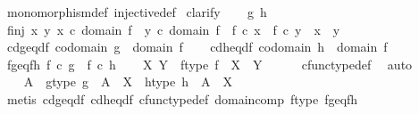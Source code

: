 \begin{isabellebody}
\ monomorphism{\isacharunderscore}{\kern0pt}def\ injective{\isacharunderscore}{\kern0pt}def\isanewline
{}\isamarkupfalse%
\ clarify\isanewline
\ \ \isamarkupfalse%
\ g\ h\isanewline
\ \ \isamarkupfalse%
\ f{\isacharunderscore}{\kern0pt}inj{\isacharcolon}{\kern0pt}\ {\isachardoublequoteopen}{\isasymforall}x\ y{\isachardot}{\kern0pt}\ x\ {\isasymin}\isactrlsub c\ domain\ f\ {\isasymand}\ y\ {\isasymin}\isactrlsub c\ domain\ f\ {\isasymand}\ f\ {\isasymcirc}\isactrlsub c\ x\ {\isacharequal}{\kern0pt}\ f\ {\isasymcirc}\isactrlsub c\ y\ {\isasymlongrightarrow}\ x\ {\isacharequal}{\kern0pt}\ y{\isachardoublequoteclose}\isanewline
\ \ \isamarkupfalse%
\ cd{\isacharunderscore}{\kern0pt}g{\isacharunderscore}{\kern0pt}eq{\isacharunderscore}{\kern0pt}d{\isacharunderscore}{\kern0pt}f{\isacharcolon}{\kern0pt}\ {\isachardoublequoteopen}codomain\ g\ {\isacharequal}{\kern0pt}\ domain\ f{\isachardoublequoteclose}\isanewline
\ \ \isamarkupfalse%
\ cd{\isacharunderscore}{\kern0pt}h{\isacharunderscore}{\kern0pt}eq{\isacharunderscore}{\kern0pt}d{\isacharunderscore}{\kern0pt}f{\isacharcolon}{\kern0pt}\ {\isachardoublequoteopen}codomain\ h\ {\isacharequal}{\kern0pt}\ domain\ f{\isachardoublequoteclose}\isanewline
\ \ \isamarkupfalse%
\ fg{\isacharunderscore}{\kern0pt}eq{\isacharunderscore}{\kern0pt}fh{\isacharcolon}{\kern0pt}\ {\isachardoublequoteopen}f\ {\isasymcirc}\isactrlsub c\ g\ {\isacharequal}{\kern0pt}\ f\ {\isasymcirc}\isactrlsub c\ h{\isachardoublequoteclose}\isanewline
\isanewline
\ \ \isamarkupfalse%
\ X\ Y\ \ f{\isacharunderscore}{\kern0pt}type{\isacharcolon}{\kern0pt}\ {\isachardoublequoteopen}f\ {\isacharcolon}{\kern0pt}\ X\ {\isasymrightarrow}\ Y{\isachardoublequoteclose}\isanewline
\ \ \ \ \isamarkupfalse%
\ cfunc{\isacharunderscore}{\kern0pt}type{\isacharunderscore}{\kern0pt}def\ \isamarkupfalse%
\ auto\ \ \ \ \isanewline
\ \ \isamarkupfalse%
\ A\ \ g{\isacharunderscore}{\kern0pt}type{\isacharcolon}{\kern0pt}\ {\isachardoublequoteopen}g\ {\isacharcolon}{\kern0pt}\ A\ {\isasymrightarrow}\ X{\isachardoublequoteclose}\ \ h{\isacharunderscore}{\kern0pt}type{\isacharcolon}{\kern0pt}\ {\isachardoublequoteopen}h\ {\isacharcolon}{\kern0pt}\ A\ {\isasymrightarrow}\ X{\isachardoublequoteclose}\isanewline
\ \ \ \ \isamarkupfalse%
\ {\isacharparenleft}{\kern0pt}metis\ cd{\isacharunderscore}{\kern0pt}g{\isacharunderscore}{\kern0pt}eq{\isacharunderscore}{\kern0pt}d{\isacharunderscore}{\kern0pt}f\ cd{\isacharunderscore}{\kern0pt}h{\isacharunderscore}{\kern0pt}eq{\isacharunderscore}{\kern0pt}d{\isacharunderscore}{\kern0pt}f\ cfunc{\isacharunderscore}{\kern0pt}type{\isacharunderscore}{\kern0pt}def\ domain{\isacharunderscore}{\kern0pt}comp\ f{\isacharunderscore}{\kern0pt}type\ fg{\isacharunderscore}{\kern0pt}eq{\isacharunderscore}{\kern0pt}fh{\isacharparenright}{\kern0pt}\isanewline

\end{isabellebody}
